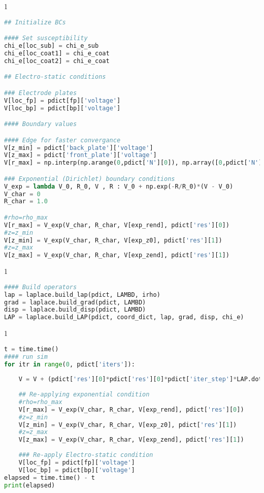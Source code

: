 \begin{spacing}{1} \begin{lstlisting}[frame=single, language=Python]
## Initialize BCs

#### Set susceptibility
chi_e[loc_sub] = chi_e_sub
chi_e[loc_coat1] = chi_e_coat
chi_e[loc_coat2] = chi_e_coat

## Electro-static conditions

### Electrode plates
V[loc_fp] = pdict[fp]['voltage']
V[loc_bp] = pdict[bp]['voltage']

#### Boundary values

#### Edge for faster convergance
V[z_min] = pdict['back_plate']['voltage']
V[z_max] = pdict['front_plate']['voltage']
V[r_max] = np.interp(np.arange(0,pdict['N'][0]), np.array([0,pdict['N'][0]-1]), np.array([pdict['back_plate']['voltage'], pdict['front_plate']['voltage']]))

### Exponential (Dirichlet) boundary conditions
V_exp = lambda V_0, R_0, V , R : V_0 + np.exp(-R/R_0)*(V - V_0) 
V_char = 0
R_char = 1.0

#rho=rho_max
V[r_max] = V_exp(V_char, R_char, V[exp_rend], pdict['res'][0])
#z=z_min
V[z_min] = V_exp(V_char, R_char, V[exp_z0], pdict['res'][1])
#z=z_max
V[z_max] = V_exp(V_char, R_char, V[exp_zend], pdict['res'][1])
\end{lstlisting} \end{spacing}

\begin{spacing}{1} \begin{lstlisting}[frame=single, language=Python]
#### Build operators
lap = laplace.build_lap(pdict, LAMBD, irho)
grad = laplace.build_grad(pdict, LAMBD)
disp = laplace.build_disp(pdict, LAMBD)
LAP = laplace.build_LAP(pdict, coord_dict, lap, grad, disp, chi_e)
\end{lstlisting} \end{spacing}

\begin{spacing}{1} \begin{lstlisting}[frame=single, language=Python]
t = time.time() 
#### run sim
for itr in range(0, pdict['iters']):
    
    V = V + (pdict['res'][0]*pdict['res'][0]*pdict['iter_step']*LAP.dot(V))
    
    ## Re-applying exponential condition
    #rho=rho_max
    V[r_max] = V_exp(V_char, R_char, V[exp_rend], pdict['res'][0])
    #z=z_min
    V[z_min] = V_exp(V_char, R_char, V[exp_z0], pdict['res'][1])
    #z=z_max
    V[z_max] = V_exp(V_char, R_char, V[exp_zend], pdict['res'][1])
    
    ### Re-apply Electro-static condition
    V[loc_fp] = pdict[fp]['voltage']
    V[loc_bp] = pdict[bp]['voltage']
elapsed = time.time() - t
print(elapsed)
\end{lstlisting} \end{spacing}


